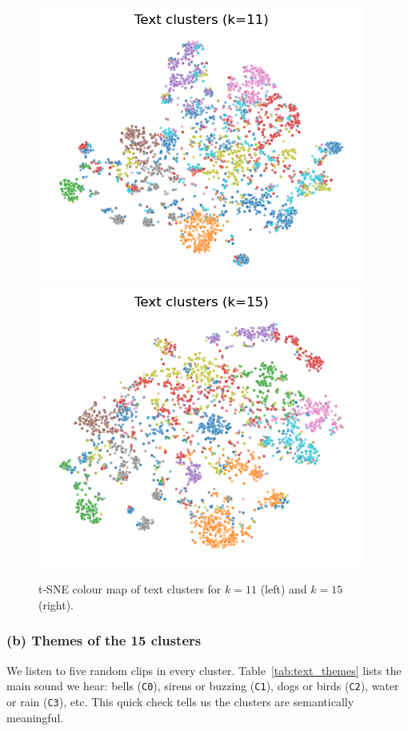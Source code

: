 \documentclass{article}
\begin{document}
\begin{figure}[h]
  \centering
  \includegraphics[width=.45\linewidth]{figs_tang/04_text_cluster11.png}\hfill
  \includegraphics[width=.45\linewidth]{figs_tang/04_text_cluster15.png}
  \caption{t‑SNE colour map of text clusters for $k=11$ (left) and $k=15$ (right).}
  \label{fig:text_tsne}
\end{figure}

\subsubsection{(b) Themes of the 15 clusters}
We listen to five random clips in every cluster. Table~\ref{tab:text_themes} lists the main sound we hear: bells (\texttt{C0}), sirens or buzzing (\texttt{C1}), dogs or birds (\texttt{C2}), water or rain (\texttt{C3}), etc. This quick check tells us the clusters are semantically meaningful.
\end{document}
